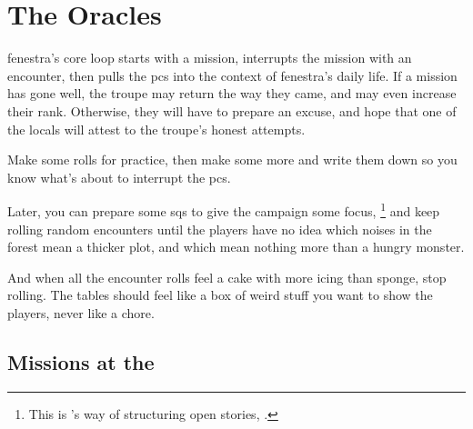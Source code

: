 \chapter{The Oracles}
\label{encounters}

\Gls{fenestra}'s core loop starts with a mission, interrupts the mission with an encounter, then pulls the \glspl{pc} into the context of \gls{fenestra}'s daily life.
If a mission has gone well, the troupe may return the way they came, and may even increase their rank.
Otherwise, they will have to prepare an excuse, and hope that one of the locals will attest to the troupe's honest attempts.

Make some rolls for practice, then make some more and write them down so you know what's about to interrupt the \glspl{pc}.

Later, you can prepare some \glspl{sq} to give the \gls{campaign} some focus,%
\footnote{This is 's way of structuring open stories, .}
and keep rolling random encounters until the players have no idea which noises in the forest mean a thicker plot, and which mean nothing more than a hungry \gls{monster}.

And when all the encounter rolls feel a cake with more icing than sponge, stop rolling.
The tables should feel like a box of weird stuff you want to show the players, never like a chore.

\section{Missions at the }
\label{NGmissions}

